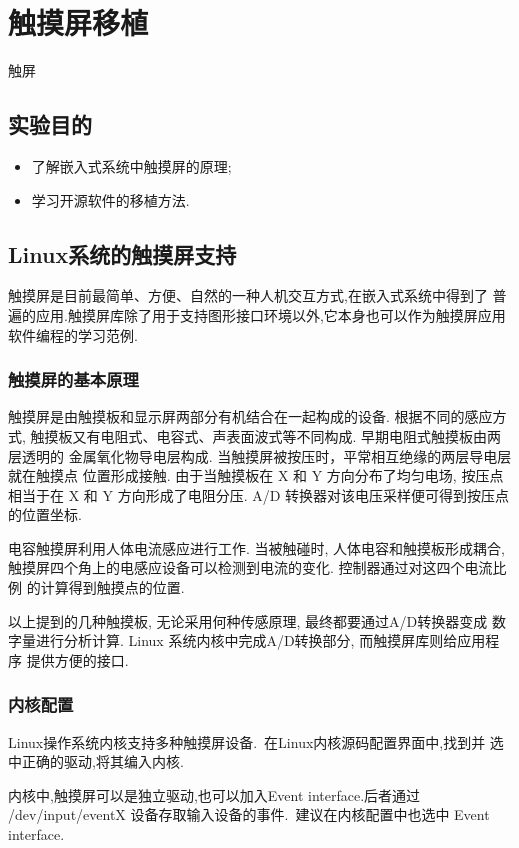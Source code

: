 \chapter{触摸屏移植}{触屏}\label{ch-ts}

\section{实验目的}
\begin{itemize}\itemsep=-3pt
  \item 了解嵌入式系统中触摸屏的原理;
  \item 学习开源软件的移植方法.
\end{itemize}

\section{Linux系统的触摸屏支持}
	触摸屏是目前最简单、方便、自然的一种人机交互方式,在嵌入式系统中得到了
普遍的应用.触摸屏库除了用于支持图形接口环境以外,它本身也可以作为触摸屏应用
软件编程的学习范例.

\subsection{触摸屏的基本原理}
    触摸屏是由触摸板和显示屏两部分有机结合在一起构成的设备. 根据不同的感应方式,
触摸板又有电阻式、电容式、声表面波式等不同构成. 早期电阻式触摸板由两层透明的
金属氧化物导电层构成. 当触摸屏被按压时，平常相互绝缘的两层导电层就在触摸点
位置形成接触. 由于当触摸板在 X 和 Y 方向分布了均匀电场, 按压点相当于在 X 和
Y 方向形成了电阻分压. A/D 转换器对该电压采样便可得到按压点的位置坐标.

    电容触摸屏利用人体电流感应进行工作. 当被触碰时, 人体电容和触摸板形成耦合,
触摸屏四个角上的电感应设备可以检测到电流的变化. 控制器通过对这四个电流比例
的计算得到触摸点的位置.

    以上提到的几种触摸板, 无论采用何种传感原理, 最终都要通过A/D转换器变成
数字量进行分析计算. Linux 系统内核中完成A/D转换部分, 而触摸屏库则给应用程序
提供方便的接口.

\subsection{内核配置}
	Linux操作系统内核支持多种触摸屏设备.~在Linux内核源码配置界面中,找到并
选中正确的驱动,将其编入内核.

	内核中,触摸屏可以是独立驱动,也可以加入Event interface.后者通过
 /dev/input/eventX 设备存取输入设备的事件.~建议在内核配置中也选中
 Event interface.

